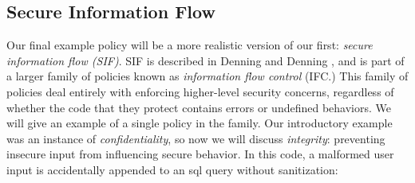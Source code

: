 \documentclass{llncs}
\begin{document}
\begin{table}[t]





\subsection{Secure Information Flow}
\label{sec:SIF}

Our final example policy will be a more realistic version of our first:
{\em secure information flow (SIF)}. SIF is described in Denning and Denning
\cite{Denning77:SecureInformationFlow}, and is part of a larger family of policies
known as {\em information flow control} (IFC.) This family of policies deal entirely with enforcing
higher-level security concerns, regardless of whether the code that they protect contains
errors or undefined behaviors. We will give an example of a single policy in the family.
Our introductory example was an instance of {\em confidentiality}, so now we will discuss
{\em integrity}: preventing insecure input from influencing secure behavior.
In this code, a malformed user input is accidentally appended to an sql query without sanitization:


\end{table}
\end{document}
